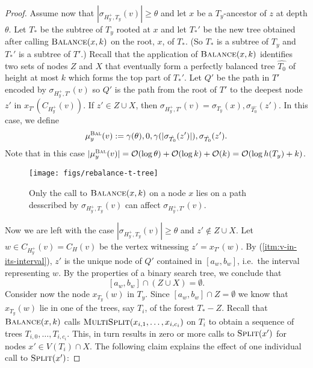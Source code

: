 \documentclass[kpfonts]{patmorin}
\newcommand{\Oh}{\mathcal{O}}
\let\geq\geqslant
\begin{document}
\begin{proof}
  Assume now that $|\sigma_{H^+_{y},T_{y}}(v)| \geq \theta$ and let $x$ be a $T_y$-ancestor of $z$ at depth $\theta$. 
  Let $T_*$ be the subtree of $T_y$ rooted at $x$ and let $T_*'$ be the new tree obtained after calling $\textsc{Balance}(x,k)$ on the root, $x$, of $T_*$. (So $T_*$ is a subtree of $T_y$ and $T_*'$ is a subtree of $T'$.)
  Recall that the application of $\textsc{Balance}(x,k)$ identifies two sets of nodes $Z$ and $X$ that eventually form a perfectly balanced tree $\hat{T_0}$ of height at most $k$ which forms the top part of $T_*'$.
  Let $Q'$ be the path in $T'$ encoded by $\sigma_{H^+_y,T'}(v)$ so $Q'$ is the path from the root of $T'$ to the deepest node $z'$ in $x_{T'}(C_{H^+_y}(v))$. 
  If $z' \in Z\cup X$, then $\sigma_{H^+_y,T'}(v) = \sigma_{T_y}(x),\sigma_{\hat{T_0}}(z')$.
  In this case, we define
  \[
  \mu_y^{\textsc{Bal}}(v) := \gamma(\theta),0,\gamma(|\sigma_{\hat{T_0}}(z')|),\sigma_{\hat{T_0}}(z').
  \]
  Note that in this case $|\mu_y^{\textsc{Bal}}(v)|=\Oh(\log\theta)+\Oh(\log k) + \Oh(k) = \Oh(\log h(T_y)+k)$.

  \begin{figure}
    \begin{center}
      \texttt{[image: figs/rebalance-t-tree]}
    \end{center}
    \caption{Only the call to $\textsc{Balance}(x,k)$ on a node $x$ lies on a path desscribed by $\sigma_{H^+_y,T_y}(v)$ can affect $\sigma_{H^+_y,T'}(v)$.}
  \end{figure}

  Now we are left with the case $|\sigma_{H^+_{y},T_{y}}(v)| \geq \theta$ and $z'\not\in Z\cup X$. 
  Let $w \in C_{H^+_y}(v)=C_H(v)$ be the vertex witnessing $z' = x_{T'}(w)$.
  By (\ref{itm:v-in-its-interval}), 
  $z'$ is the unique node of $Q'$ contained in $[a_w,b_w]$, i.e.\ the interval representing $w$. 
  By the properties of a binary search tree, we conclude that
  \[
  [a_w,b_w]\cap (Z\cup X)=\emptyset.
  \]
  Consider now the node $x_{T_y}(w)$ in $T_y$. Since $[a_w,b_w]\cap Z=\emptyset$ we know that $x_{T_y}(w)$ lie in one of the trees, say $T_i$, of the forest $T_*-Z$.
  Recall that $\textsc{Balance}(x,k)$ calls $\textsc{MultiSplit}(x_{i,1},\ldots,x_{i,c_i})$ on $T_{i}$ to obtain a sequence of trees $T_{i,0},\ldots,T_{i,c_i}$. 
  This, in turn results in zero or more calls to $\textsc{Split}(x')$ for nodes $x'\in V(T_{i})\cap X$. The following claim explains the effect of one individual call to $\textsc{Split}(x')$:


\end{proof}
\end{document}
